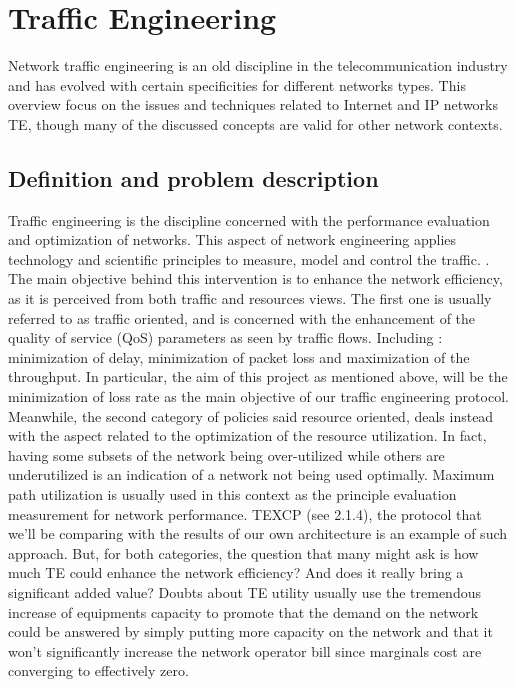 
\section{Traffic Engineering}


Network traffic engineering is an old discipline in the telecommunication industry and has evolved with certain specificities for different networks types. This overview focus on the issues and techniques related to Internet and IP networks TE, though many of the discussed concepts are valid for other network contexts.

\subsection{Definition and problem description}


	Traffic engineering is the discipline concerned with the performance evaluation  and optimization of  networks.  This aspect of network engineering applies technology and scientific principles to measure, model and control the traffic.  \cite {RFC 3272}.  \\
The main objective behind this intervention is to enhance the network efficiency, as it is perceived  from both  traffic and  resources views. The first one is usually referred to as traffic oriented, and is concerned with the enhancement of the quality of service (QoS) parameters as seen by traffic flows. Including : minimization of delay, minimization of packet loss and maximization of the throughput. In particular, the aim of this project as mentioned above, will be the minimization of loss rate as the main objective of our traffic engineering protocol.\\
Meanwhile, the second category of policies said resource oriented,  deals instead with the aspect related to the optimization of the resource utilization. In fact, having some subsets of the network being over-utilized while others are underutilized is an indication of a network not being used optimally. Maximum path utilization is usually used in this context as the principle evaluation measurement for network performance. TEXCP (see 2.1.4), the protocol that we'll be comparing with the results of our own architecture is an example of such approach. 
But, for both categories, the question that many might ask is how much TE could enhance the network efficiency? And does it really bring a significant added value? Doubts about TE utility usually use the tremendous increase of equipments capacity to promote that the demand on the network could be answered by simply putting more capacity on the network and that it won't significantly increase the network operator bill since marginals cost are converging to effectively zero.
